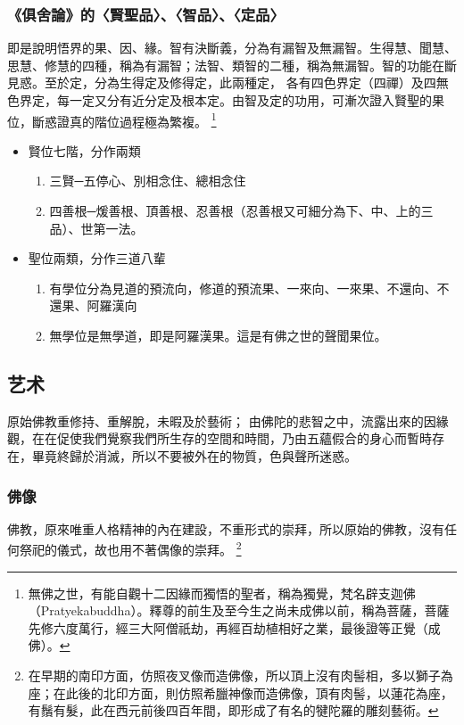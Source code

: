 \subsubsection{《俱舍論》的〈賢聖品〉、〈智品〉、〈定品〉}
即是說明悟界的果、因、緣。智有決斷義，分為有漏智及無漏智。生得慧、聞慧、思慧、修慧的四種，稱為有漏智；法智、類智的二種，稱為無漏智。智的功能在斷見惑。至於定，分為生得定及修得定，此兩種定，
各有四色界定（四禪）及四無色界定，每一定又分有近分定及根本定。由智及定的功用，可漸次證入賢聖的果位，斷惑證真的階位過程極為繁複。
\footnote{無佛之世，有能自觀十二因緣而獨悟的聖者，稱為獨覺，梵名辟支迦佛（Pratyekabuddha）。釋尊的前生及至今生之尚未成佛以前，稱為菩薩，菩薩先修六度萬行，經三大阿僧祇劫，再經百劫植相好之業，最後證等正覺（成佛）。}
\begin{itemize}
  \item
    賢位七階，分作兩類
    \begin{enumerate}
      \item 三賢─五停心、別相念住、總相念住
      \item 四善根─煖善根、頂善根、忍善根（忍善根又可細分為下、中、上的三品）、世第一法。
    \end{enumerate}
  \item
    聖位兩類，分作三道八輩
    \begin{enumerate}
      \item 有學位分為見道的預流向，修道的預流果、一來向、一來果、不還向、不還果、阿羅漢向
      \item 無學位是無學道，即是阿羅漢果。這是有佛之世的聲聞果位。
    \end{enumerate}
\end{itemize}


\subsection{艺术}
原始佛教重修持、重解脫，未暇及於藝術；
由佛陀的悲智之中，流露出來的因緣觀，在在促使我們覺察我們所生存的空間和時間，乃由五蘊假合的身心而暫時存在，畢竟終歸於消滅，所以不要被外在的物質，色與聲所迷惑。


\subsubsection{佛像}
佛教，原來唯重人格精神的內在建設，不重形式的崇拜，所以原始的佛教，沒有任何祭祀的儀式，故也用不著偶像的崇拜。
\footnote{在早期的南印方面，仿照夜叉像而造佛像，所以頂上沒有肉髻相，多以獅子為座；在此後的北印方面，則仿照希臘神像而造佛像，頂有肉髻，以蓮花為座，有鬚有髮，此在西元前後四百年間，即形成了有名的犍陀羅的雕刻藝術。}

